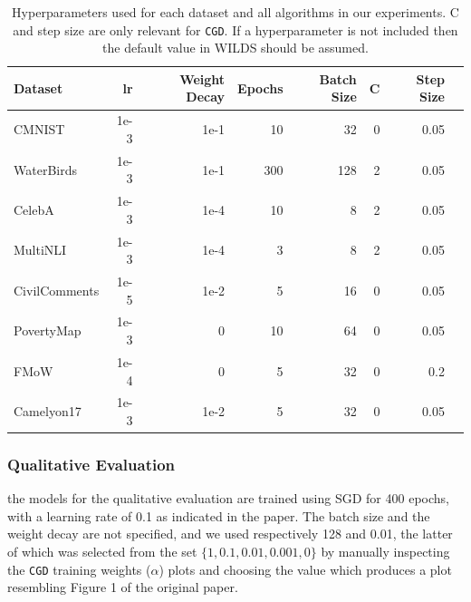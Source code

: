 \begin{table}
\centering
\begin{tabular}{lrrrrrrr}\toprule
    \textbf{Dataset} & \textbf{lr} & \textbf{Weight Decay} & \textbf{Epochs} & \textbf{Batch Size} & \textbf{C} & \textbf{Step Size} \\\midrule
CMNIST & 1e-3 & 1e-1 & 10 & 32 & 0 & 0.05 \\
WaterBirds & 1e-3 & 1e-1 & 300 & 128 & 2 & 0.05 \\
CelebA & 1e-3 & 1e-4 & 10 & 8 & 2 & 0.05 \\
MultiNLI & 1e-3 & 1e-4 & 3 & 8 & 2 & 0.05 \\
CivilComments & 1e-5 & 1e-2 & 5 & 16 & 0 & 0.05 \\
PovertyMap & 1e-3 & 0 & 10 & 64 & 0 & 0.05 \\
FMoW & 1e-4 & 0 & 5 & 32 & 0 & 0.2 \\
Camelyon17 & 1e-3 & 1e-2 & 5 & 32 & 0 & 0.05\\\bottomrule

\end{tabular}
\caption{Hyperparameters used for each dataset and all algorithms in our experiments. C and step size are only relevant for \texttt{CGD}. If a hyperparameter is not included then the default value in WILDS should be assumed.}
\label{tab:hyps}
\end{table}

\subsubsection{Qualitative Evaluation} the models for the qualitative evaluation are trained using SGD for 400 epochs, with a learning rate of 0.1 as indicated in the paper. The batch size and the weight decay are not specified, and we used respectively 128 and 0.01, the latter of which was selected from the set $\{1, 0.1, 0.01, 0.001, 0\}$ by manually inspecting the \texttt{CGD} training weights ($\alpha$) plots and choosing the value which produces a plot resembling Figure 1 of the original paper.

